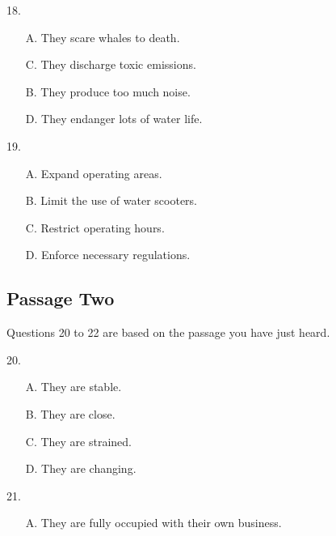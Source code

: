 \documentclass[UTF8,11pt]{ctexart}
\begin{document}
18.


\begin{itemize}[leftmargin=2em,itemsep=.2em,topsep=.4em]\item[A.] They scare whales to death.
\item[C.] They discharge toxic emissions.
\end{itemize}

\begin{itemize}[leftmargin=2em,itemsep=.2em,topsep=.4em]\item[B.] They produce too much noise.
\item[D.] They endanger lots of water life.
\end{itemize}

19.


\begin{itemize}[leftmargin=2em,itemsep=.2em,topsep=.4em]\item[A.] Expand operating areas.
\item[B.] Limit the use of water scooters.
\end{itemize}

\begin{itemize}[leftmargin=2em,itemsep=.2em,topsep=.4em]\item[C.] Restrict operating hours.
\item[D.] Enforce necessary regulations.
\end{itemize}

\subsection*{Passage Two}


Questions 20 to 22 are based on the passage you have just heard.


20.


\begin{itemize}[leftmargin=2em,itemsep=.2em,topsep=.4em]\item[A.] They are stable.
\item[B.] They are close.
\item[C.] They are strained.
\item[D.] They are changing.
\end{itemize}

21.


\begin{itemize}[leftmargin=2em,itemsep=.2em,topsep=.4em]\item[A.] They are fully occupied with their own business.
\end{itemize}
\end{document}
